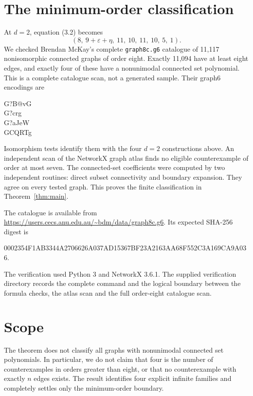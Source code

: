 \documentclass[11pt]{article}
\numberwithin{equation}{section}
\begin{document}
\section{The minimum-order classification}

At $d=2$, equation (3.2) becomes
\[
(8,\ 9+\varepsilon+\eta,\ 11,\ 10,\ 11,\ 10,\ 5,\ 1).
\]
We checked Brendan McKay's complete \texttt{graph8c.g6} catalogue of 11,117 nonisomorphic connected
graphs of order eight. Exactly 11,094 have at least eight edges, and exactly four of these have a
nonunimodal connected set polynomial. This is a complete catalogue scan, not a generated sample.
Their graph6 encodings are
\begin{flushleft}
\ttfamily
G?B@vG\\
G?\textasciigrave{}crg\\
G?aJeW\\
GCQRTg
\end{flushleft}
Isomorphism tests identify them with the four $d=2$ constructions above. An independent scan of
the NetworkX graph atlas finds no eligible counterexample of order at most seven. The connected-set
coefficients were computed by two independent routines: direct subset connectivity and boundary
expansion. They agree on every tested graph. This proves the finite classification in
Theorem~\ref{thm:main}.

The catalogue is available from
\url{https://users.cecs.anu.edu.au/~bdm/data/graph8c.g6}. Its expected SHA-256 digest is
\begin{center}
\small\ttfamily
0002354F1AB3344A2706626A037AD15367BF23A2163AA68F552C3A169CA9A036.
\end{center}
The verification used Python 3 and NetworkX 3.6.1. The supplied verification directory records the
complete command and the logical boundary between the formula checks, the atlas scan and the full
order-eight catalogue scan.

\section{Scope}

The theorem does not classify all graphs with nonunimodal connected set polynomials. In particular,
we do not claim that four is the number of counterexamples in orders greater than eight, or that no
counterexample with exactly $n$ edges exists. The result identifies four explicit infinite
families and completely settles only the minimum-order boundary.
\end{document}
